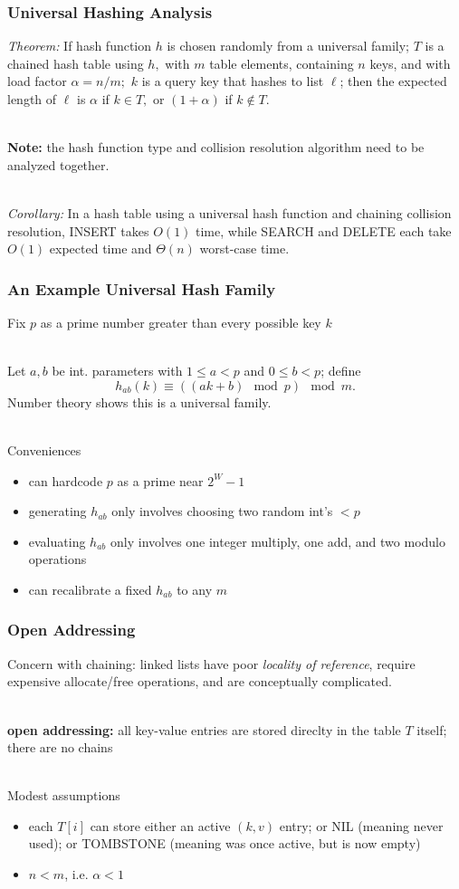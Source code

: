 \documentclass{beamer}
\newcommand{\stanza}{ \\~\ }
\begin{document}
\begin{frame} \frametitle{Universal Hashing Analysis}
\emph{Theorem:} If hash function $h$ is chosen randomly from a universal family;
$T$ is a chained hash table using $h,$
with $m$ table elements,
containing $n$ keys,
and with load factor $\alpha=n/m;$
$k$ is a query key that hashes to list $\ell$;
then the expected length of $\ell$ is $\alpha$ if $k \in T,$ or
$(1+\alpha)$ if $k \notin T.$ \stanza

\textbf{Note:} the hash function type and collision resolution algorithm need
to be analyzed together. \stanza

\emph{Corollary:} In a hash table using a universal hash function and chaining
collision resolution, INSERT takes $O(1)$ time, while SEARCH and DELETE each
take $O(1)$ expected time and $\Theta(n)$ worst-case time.
\end{frame}

\begin{frame} \frametitle{An Example Universal Hash Family}
Fix $p$ as a prime number greater than every possible key $k$ \stanza

Let $a, b$ be int. parameters with $1 \leq a < p$ and $0 \leq b < p$; define
\[ h_{ab}(k) \equiv ((ak + b) \mod p) \mod m . \]
Number theory shows this is a universal family. \stanza

Conveniences
\begin{itemize}
  \item can hardcode $p$ as a prime near $2^W-1$
  \item generating $h_{ab}$ only involves choosing two random int's $<p$
  \item evaluating $h_{ab}$ only involves one integer multiply, one add,
    and two modulo operations
  \item can recalibrate a fixed $h_{ab}$ to any $m$
\end{itemize}
\end{frame}

\begin{frame} \frametitle{Open Addressing}
Concern with chaining: linked lists have poor \emph{locality of reference},
require expensive allocate/free operations, and are conceptually complicated. \stanza

\textbf{open addressing:} all key-value entries are stored direclty in the table $T$ itself;
there are no chains \stanza

Modest assumptions
\begin{itemize}
  \item each $T[i]$ can store either an active $(k, v)$ entry; or NIL (meaning
    never used); or TOMBSTONE (meaning was once active, but is now empty)
  \item $n<m$, i.e. $\alpha<1$
\end{itemize}
\end{frame}
\end{document}
